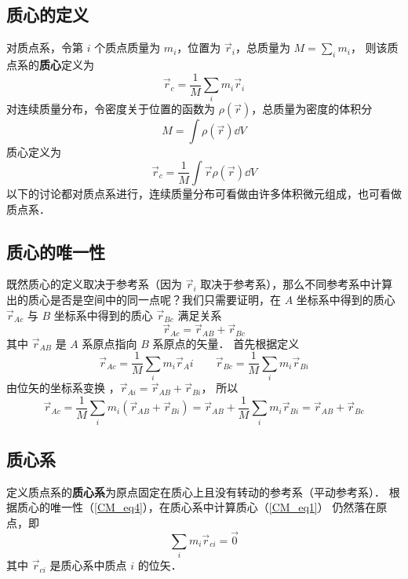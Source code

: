 

\subsection{质心的定义}

对质点系，令第 $i$ 个质点质量为 $m_i$，位置为 ${\vec r_i}$，总质量为 $M = \sum\limits_i m_i$， 则该质点系的\textbf{质心}定义为
\begin{equation}\label{CM_eq1}
{\vec r_c} = \frac{1}{M}\sum_i {{m_i}{{\vec r}_i}} 
\end{equation}
对连续质量分布，令密度关于位置的函数为 $\rho (\vec r)$，总质量为密度的体积分 %
\begin{equation}
M = \int \rho (\vec r) \dd{V}
\end{equation}
质心定义为
\begin{equation}
{\vec r_c} = \frac{1}{M}\int \vec r\rho (\vec r) \dd{V}
\end{equation}
以下的讨论都对质点系进行，连续质量分布可看做由许多体积微元组成，也可看做质点系．

\subsection{质心的唯一性}
既然质心的定义取决于参考系（因为 $\vec r_i$ 取决于参考系），那么不同参考系中计算出的质心是否是空间中的同一点呢？我们只需要证明，在 $A$ 坐标系中得到的质心 $\vec r_{Ac}$ 与 $B$ 坐标系中得到的质心 $\vec r_{Bc}$ 满足关系
\begin{equation}\label{CM_eq4}
{\vec r_{Ac}} = {\vec r_{AB}} + {\vec r_{Bc}}
\end{equation}
其中 $\vec r_{AB}$ 是 $A$ 系原点指向 $B$ 系原点的矢量． 首先根据定义
\begin{equation}
\vec r_{Ac} = \frac{1}{M}\sum_i m_i \vec r_Ai  \qquad \vec r_{Bc} = \frac{1}{M}\sum_i  m_i \vec r_{Bi} 
\end{equation}
由位矢的坐标系变换%
，$\vec r_{Ai} = \vec r_{AB} + \vec r_{Bi}$， 所以
\begin{equation}
\vec r_{Ac} = \frac{1}{M}\sum_i m_i(\vec r_{AB} + \vec r_{Bi})  = \vec r_{AB} + \frac{1}{M} \sum_i m_i \vec r_{Bi}  = \vec r_{AB} + \vec r_{Bc}
\end{equation}
 
\subsection{质心系}
定义质点系的\textbf{质心系}为原点固定在质心上且没有转动的参考系（平动参考系）．%
根据质心的唯一性（\autoref{CM_eq4}），在质心系中计算质心（\autoref{CM_eq1}） 仍然落在原点，即
\begin{equation}\label{CM_eq7}
\sum_i m_i \vec r_{ci} = \vec 0
\end{equation}
其中 $\vec r_{ci}$ 是质心系中质点 $i$ 的位矢．

